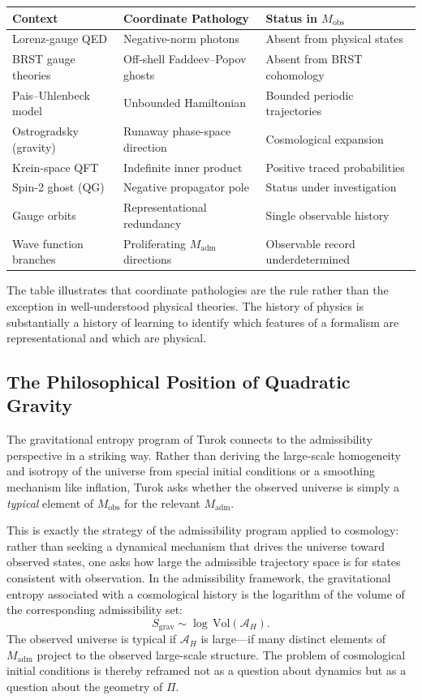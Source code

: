 \documentclass[12pt,a4paper]{article}
\theoremstyle{remark}
\begin{document}
\medskip
{\small
\begin{center}
\begin{tabular}{p{3.2cm}p{4.2cm}p{4.2cm}}
\toprule
Context & Coordinate Pathology & Status in $M_{\mathrm{obs}}$ \\
\midrule
Lorenz-gauge QED & Negative-norm photons & Absent from physical states \\
BRST gauge theories & Off-shell Faddeev--Popov ghosts & Absent from BRST cohomology \\
Pais--Uhlenbeck model & Unbounded Hamiltonian & Bounded periodic trajectories \\
Ostrogradsky (gravity) & Runaway phase-space direction & Cosmological expansion \\
Krein-space QFT & Indefinite inner product & Positive traced probabilities \\
Spin-2 ghost (QG) & Negative propagator pole & Status under investigation \\
Gauge orbits & Representational redundancy & Single observable history \\
Wave function branches & Proliferating $M_{\mathrm{adm}}$ directions & Observable record underdetermined \\
\bottomrule
\end{tabular}
\end{center}}
\medskip

The table illustrates that coordinate pathologies are the rule rather than
the exception in well-understood physical theories. The history of physics
is substantially a history of learning to identify which features of a
formalism are representational and which are physical.

\subsection{The Philosophical Position of Quadratic Gravity}

The gravitational entropy program of Turok connects to the admissibility
perspective in a striking way. Rather than deriving the large-scale
homogeneity and isotropy of the universe from special initial conditions
or a smoothing mechanism like inflation, Turok asks whether the observed
universe is simply a \emph{typical} element of $M_{\mathrm{obs}}$ for the
relevant $M_{\mathrm{adm}}$.

This is exactly the strategy of the admissibility program applied to
cosmology: rather than seeking a dynamical mechanism that drives the
universe toward observed states, one asks how large the admissible
trajectory space is for states consistent with observation. In the
admissibility framework, the gravitational entropy associated with a
cosmological history is the logarithm of the volume of the corresponding
admissibility set:
\begin{equation}
  S_{\mathrm{grav}} \sim \log\,\mathrm{Vol}(\mathcal{A}_H).
\end{equation}
The observed universe is typical if $\mathcal{A}_H$ is large---if many
distinct elements of $M_{\mathrm{adm}}$ project to the observed large-scale
structure. The problem of cosmological initial conditions is thereby
reframed not as a question about dynamics but as a question about the
geometry of $\Pi$.
\end{document}
